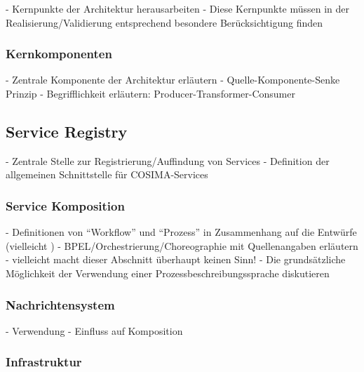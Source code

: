   - Kernpunkte der Architektur herausarbeiten
  - Diese Kernpunkte müssen in der Realisierung/Validierung entsprechend besondere Berücksichtigung finden
  
\subsubsection{Kernkomponenten} %
\label{ssub:kernkomponenten}

   - Zentrale Komponente der Architektur erläutern
   - Quelle-Komponente-Senke Prinzip
   - Begrifflichkeit erläutern: Producer-Transformer-Consumer


\subsection{Service Registry} %
\label{sub:service_registry}

  - Zentrale Stelle zur Registrierung/Auffindung von Services
  - Definition der allgemeinen Schnittstelle für COSIMA-Services


\subsubsection{Service Komposition} %
\label{ssub:service_komposition}

  - Definitionen von "`Workflow"' und "`Prozess"' in Zusammenhang auf die Entwürfe (vielleicht )
  - BPEL/Orchestrierung/Choreographie mit Quellenangaben erläutern
  - vielleicht macht dieser Abschnitt überhaupt keinen Sinn!
  - Die grundsätzliche Möglichkeit der Verwendung einer Prozessbeschreibungssprache diskutieren


\subsubsection{Nachrichtensystem} %
\label{ssub:nachrichtensystem}

  - Verwendung
  - Einfluss auf Komposition


\subsubsection{Infrastruktur} %
\label{ssub:infrastruktur}


